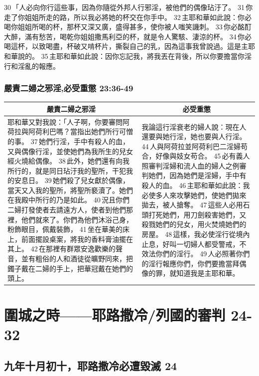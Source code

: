 30 「人必向你行這些事，因為你隨從外邦人行邪淫，被他們的偶像玷汙了。 31 你走了你姐姐所走的路，所以我必將她的杯交在你手中。 32 主耶和華如此說：你必喝你姐姐所喝的杯，那杯又深又廣，盛得甚多，使你被人嗤笑譏刺。 33 你必酩酊大醉，滿有愁苦，喝乾你姐姐撒馬利亞的杯，就是令人驚駭、淒涼的杯。 34 你必喝這杯，以致喝盡，杯破又啃杯片，撕裂自己的乳，因為這事我曾說過。這是主耶和華說的。 35 主耶和華如此說：因你忘記我，將我丟在背後，所以你要擔當你淫行和淫亂的報應。

\subsubsection{嚴責二婦之邪淫,必受重懲 23:36-49}
\begin{table}[H]
\centering
\begin{tabular}{p{8.5cm}|p{9.0cm}}\hline\hline
\multicolumn{1}{c|}{嚴責二婦之邪淫}&\multicolumn{1}{c}{必受重懲}\\\hline
耶和華又對我說：「人子啊，你要審問阿荷拉與阿荷利巴嗎？當指出她們所行可憎的事。 37 她們行淫，手中有殺人的血，又與偶像行淫，並使她們為我所生的兒女經火燒給偶像。 38 此外，她們還有向我所行的，就是同日玷汙我的聖所，干犯我的安息日。 39 她們殺了兒女獻於偶像，當天又入我的聖所，將聖所褻瀆了。她們在我殿中所行的乃是如此。 40 況且你們二婦打發使者去請遠方人，使者到他們那裡，他們就來了。你們為他們沐浴己身，粉飾眼目，佩戴裝飾， 41 坐在華美的床上，前面擺設桌案，將我的香料膏油擺在其上。 42 在那裡有群眾安逸歡樂的聲音，並有粗俗的人和酒徒從曠野同來，把鐲子戴在二婦的手上，把華冠戴在她們的頭上。

&我論這行淫衰老的婦人說：現在人還要與她行淫，她也要與人行淫。 44 人與阿荷拉並阿荷利巴二淫婦苟合，好像與妓女苟合。 45 必有義人照審判淫婦和流人血的婦人之例審判她們，因為她們是淫婦，手中有殺人的血。 46 主耶和華如此說：我必使多人來攻擊她們，使她們拋來拋去，被人搶奪。 47 這些人必用石頭打死她們，用刀劍殺害她們，又殺戮她們的兒女，用火焚燒她們的房屋。 48 這樣，我必使淫行從境內止息，好叫一切婦人都受警戒，不效法你們的淫行。 49 人必照著你們的淫行報應你們，你們要擔當拜偶像的罪，就知道我是主耶和華。\\\hline
\end{tabular}
\end{table}



\section{圍城之時——耶路撒冷/列國的審判 24-32}
\subsection{九年十月初十，耶路撒冷必遭毀滅 24}

